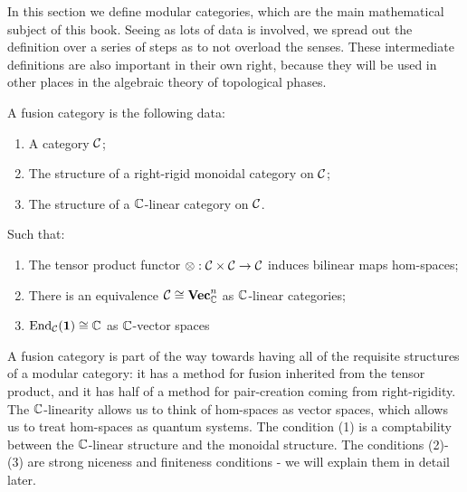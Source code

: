 In this section we define modular categories, which are the main mathematical subject of this book. Seeing as lots of data is involved, we spread out the definition over a series of steps as to not overload the senses. These intermediate definitions are also important in their own right, because they will be used in other places in the algebraic theory of topological phases.


\begin{defn} A fusion category is the following data:

\begin{enumerate}
\item A category ${\mathcal C}$;
\item The structure of a right-rigid monoidal category on ${\mathcal C}$;
\item The structure of a ${\mathbb C}$-linear category on ${\mathcal C}$.
\end{enumerate}

Such that:

\begin{enumerate}
\item The tensor product functor $\otimes: {\mathcal C}\times {\mathcal C}\to {\mathcal C}$ induces bilinear maps hom-spaces;
\item There is an equivalence ${\mathcal C} \cong {\bf Vec}_{\mathbb C}^n$ as ${\mathbb C}$-linear categories;
\item $\operatorname{End}_{\mathcal C}({\mathbf 1})\cong {\mathbb C}$ as ${\mathbb C}$-vector spaces
\end{enumerate}


\end{defn}

\begin{rem}
A fusion category is part of the way towards having all of the requisite structures of a modular category: it has a method for fusion inherited from the tensor product, and it has half of a method for pair-creation coming from right-rigidity. The ${\mathbb C}$-linearity allows us to think of hom-spaces as vector spaces, which allows us to treat hom-spaces as quantum systems. The condition (1) is a comptability between the ${\mathbb C}$-linear structure and the monoidal structure. The conditions (2)-(3) are strong niceness and finiteness conditions - we will explain them in detail later.
\end{rem}

